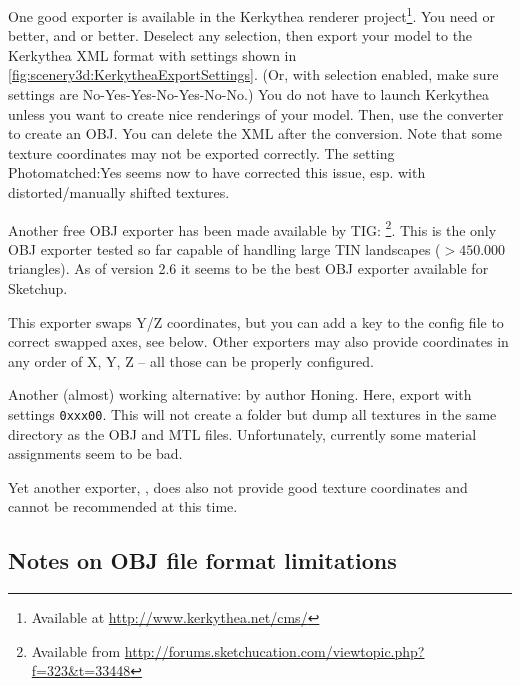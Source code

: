 One good exporter is available in the Kerkythea renderer project\footnote{
Available at \url{http://www.kerkythea.net/cms/}}.  You need
or better, and  or better.  Deselect any selection, then
export your model to the Kerkythea XML format with settings shown in
\ref{fig:scenery3d:KerkytheaExportSettings}.
(Or, with selection enabled, make sure settings are No-Yes-Yes-No-Yes-No-No.)  
You do not have to launch Kerkythea unless you want to create nice renderings of
your model. 
Then, use the  converter to create an OBJ.  You can delete the
XML after the conversion.  Note that some texture coordinates may not be
exported correctly. The setting Photomatched:Yes seems now to have
corrected this issue, esp. with distorted/manu\-ally shifted textures.

Another free OBJ exporter has been made available by 
TIG: \footnote{Available from
\url{http://forums.sketchucation.com/viewtopic.php?f=323&t=33448}}. 
This is the only OBJ exporter tested so far capable of handling large TIN landscapes
($>450.000$ triangles). 
As of version 2.6 it seems to be the best OBJ exporter available for Sketchup. 


This exporter swaps Y/Z coordinates, but you can add a key to the config file to
correct swapped axes, see below. Other exporters may also provide coordinates in
any order of X, Y, Z -- all those can be properly configured.

Another (almost) working alternative:  by author
Honing.  Here, export with settings \texttt{0xxx00}. This will not create a
 folder but dump all textures in the same directory as the OBJ
and MTL files. Unfortunately, currently some material assignments seem to be
bad.

Yet another exporter, , does also not provide good texture
coordinates and cannot be recommended at this time.

\subsection{Notes on OBJ file format limitations}
\label{sec:scenery3d:OBJlimitations}

